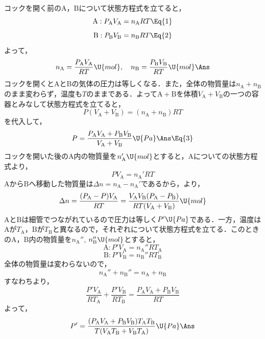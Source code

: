 \begin{kaitou}
\begin{komon}
 コックを開く前の$\mathrm{A}$，$\mathrm{B}$について状態方程式を立てると，
       \[\mathrm{A}:P_{\mathrm{A}}V_{\mathrm{A}}=n_{\mathrm{A}}RT\Eq{1}\]
       \[\mathrm{B}:P_{\mathrm{B}}V_{\mathrm{B}}=n_{\mathrm{B}}RT\Eq{2}\]
       よって，
       \[n_{\mathrm{A}}=\frac{P_{\mathrm{A}}V_{\mathrm{A}}}{RT}\U{mol}, \quad n_{\mathrm{B}}=\frac{P_{\mathrm{B}}V_{\mathrm{B}}}{RT}\U{mol}\Ans\]
 コックを開くと$\mathrm{A}$と$\mathrm{B}$の気体の圧力は等しくなる．また，全体の物質量は$n_{\mathrm{A}}+n_{\mathrm{B}}$のまま変わらず，温度も$T$のままである．よって$\mathrm{A}+\mathrm{B}$を体積$V_{\mathrm{A}}+V_{\mathrm{B}}$の一つの容器とみなして状態方程式を立てると，
       \[P(V_{\mathrm{A}}+V_{\mathrm{B}})=(n_{\mathrm{A}}+n_{\mathrm{B}})RT\]
       を代入して，
       \[P=\frac{P_{\mathrm{A}}V_{\mathrm{A}}+P_{\mathrm{B}}V_{\mathrm{B}}}{V_{\mathrm{A}}+V_{\mathrm{B}}}\U{Pa}\Ans\Eq{3}\]
 コックを開いた後の$\mathrm{A}$内の物質量を$n_{\mathrm{A}}'\U{mol}$とすると，$\mathrm{A}$についての状態方程式より，
       \[PV_{\mathrm{A}}=n_{\mathrm{A}}'RT\]
       $\mathrm{A}$から$\mathrm{B}$へ移動した物質量は$\Delta n=n_{\mathrm{A}}-n_{\mathrm{A}}'$であるから，より，
       \[\Delta n=\frac{(P_{\mathrm{A}}-P)V_{\mathrm{A}}}{RT}=\frac{V_{\mathrm{A}}V_{\mathrm{B}}(P_{\mathrm{A}}-P_{\mathrm{B}})}{RT(V_{\mathrm{A}}+V_{\mathrm{B}})}\U{mol}\]
       \hspace*{\fill}\Ans
{} $\mathrm{A}$と$\mathrm{B}$は細管でつながれているので圧力は等しく$P'\U{Pa}$である．一方，温度は$\mathrm{A}$が$T_{\mathrm{A}}$，$\mathrm{B}$が$T_{\mathrm{B}}$と異なるので，それぞれについて状態方程式を立てる．このときの$\mathrm{A}$，$\mathrm{B}$内の物質量を$n_{\mathrm{A}}''$, $n_{\mathrm{B}}''\U{mol}$とすると，
       \[\mathrm{A}:P'V_{\mathrm{A}}=n_{\mathrm{A}}''RT_{\mathrm{A}}\]
       \[\mathrm{B}:P'V_{\mathrm{B}}=n_{\mathrm{B}}''RT_{\mathrm{B}}\]
       \hspace{1zw}全体の物質量は変わらないので，
       \[n_{\mathrm{A}}''+n_{\mathrm{B}}''=n_{\mathrm{A}}+n_{\mathrm{B}}\]
       すなわちより，
       \[\frac{P'V_{\mathrm{A}}}{RT_{\mathrm{A}}}+\frac{P'V_{\mathrm{B}}}{RT_{\mathrm{B}}}=\frac{P_{\mathrm{A}}V_{\mathrm{A}}+P_{\mathrm{B}}V_{\mathrm{B}}}{RT}\]
       よって，
       \[P'=\frac{(P_{\mathrm{A}}V_{\mathrm{A}}+P_{\mathrm{B}}V_{\mathrm{B}})T_{\mathrm{A}}T_{\mathrm{B}}}{T(V_{\mathrm{A}}T_{\mathrm{B}}+V_{\mathrm{B}}T_{\mathrm{A}})}\U{Pa}\Ans\]
\end{komon}
\end{kaitou}

